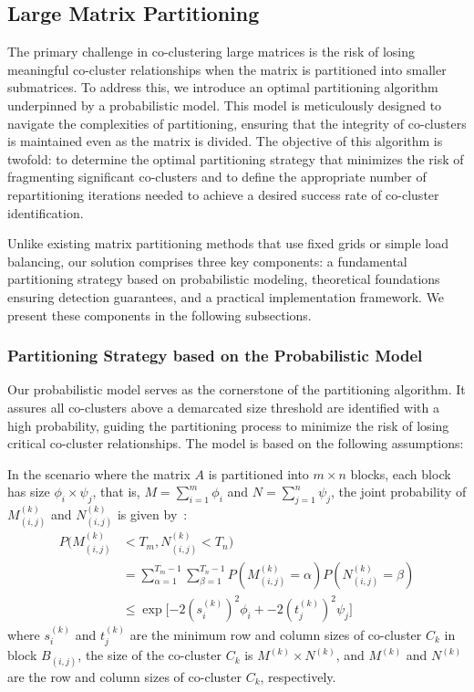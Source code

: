 \documentclass[journal]{IEEEtran}
\theoremstyle{definition}
\theoremstyle{remark} %
\begin{document}
\subsection{Large Matrix Partitioning}
\label{subsec:large-matrix-partitioning}
The primary challenge in co-clustering large matrices is the risk of losing meaningful co-cluster relationships when the matrix is partitioned into smaller submatrices. To address this, we introduce an optimal partitioning algorithm underpinned by a probabilistic model. This model is meticulously designed to navigate the complexities of partitioning, ensuring that the integrity of co-clusters is maintained even as the matrix is divided. The objective of this algorithm is twofold: to determine the optimal partitioning strategy that minimizes the risk of fragmenting significant co-clusters and to define the appropriate number of repartitioning iterations needed to achieve a desired success rate of co-cluster identification.

    {\color{blue}Unlike existing matrix partitioning methods that use fixed grids or simple load balancing,  our solution comprises three key components: a fundamental partitioning strategy based on probabilistic modeling, theoretical foundations ensuring detection guarantees, and a practical implementation framework. We present these components in the following subsections.
    }
\subsubsection{Partitioning Strategy based on the Probabilistic Model}

Our probabilistic model serves as the cornerstone of the partitioning algorithm. It assures all co-clusters above a demarcated size threshold are identified with a high probability, guiding the partitioning process to minimize the risk of losing critical co-cluster relationships. The model is based on the following assumptions:

In the scenario where the matrix $A$ is partitioned into $m \times n$ blocks, each block has size $\phi_i \times \psi_j$, that is, $M=\sum_{i=1}^m \phi_i$ and $N=\sum_{j=1}^n \psi_j$, the joint probability of $M_{(i,j)}^{(k)}$ and $N_{(i,j)}^{(k)}$ is given by~:
\begin{equation}
    \begin{split}
        P(M_{(i,j)}^{(k)} & < T_m, N_{(i,j)}^{(k)} < T_n)                                                                           \\
                          & = \sum_{\alpha=1}^{T_m-1} \sum_{\beta=1}^{T_n-1} P(M_{(i,j)}^{(k)} = \alpha) P(N_{(i,j)}^{(k)} = \beta) \\
                          & \le \exp[-2 (s_i^{(k)})^2 \phi_i + -2 (t_j^{(k)})^2 \psi_j\rbrack
    \end{split}
\end{equation}
where $s_i^{(k)}$ and $t_j^{(k)}$ are the minimum row and column sizes of co-cluster $C_k$ in block $B_{(i,j)}$, the size of the co-cluster $C_k$ is $M^{(k)} \times N^{(k)}$, and $M^{(k)}$ and $N^{(k)}$ are the row and column sizes of co-cluster $C_k$, respectively.
\end{document}
